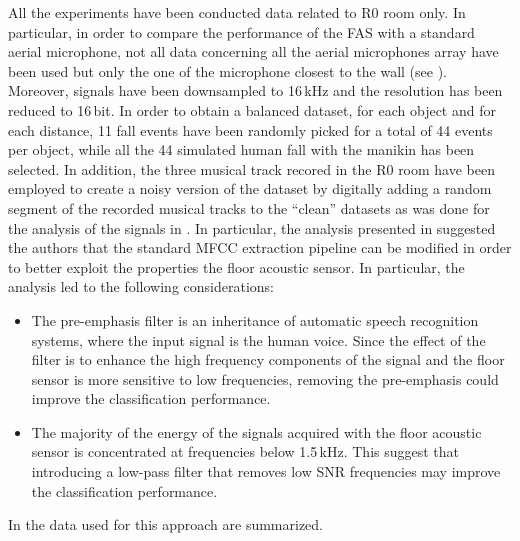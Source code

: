 All the experiments have been conducted data related to R0 room only. In particular, in order to compare the performance of the FAS with a standard aerial microphone, not all data concerning all the aerial microphones array have been used but only the one of the microphone closest to the wall (see ). Moreover, signals have been downsampled to 16\,kHz and the resolution has been reduced to 16\,bit. In order to obtain a balanced dataset, for each object and
for each distance, 11 fall events have been randomly picked for a total of 44 events per
object, while all the 44 simulated human fall with the manikin has been selected. In addition, the three musical track recored in the R0 room have been employed to create a noisy version of
the dataset by digitally adding a random segment of the recorded musical tracks
to the ``clean'' datasets as was done for the analysis of the signals in . In particular, the analysis presented in  suggested the authors that the standard MFCC extraction pipeline can be modified in order to better exploit the properties the floor acoustic sensor. In particular, the analysis led to the following considerations:
\begin{itemize}
	\item The pre-emphasis filter is an inheritance of automatic speech recognition systems, where the input signal is the human voice. Since the effect of the filter is to enhance the high frequency components of the signal and the floor sensor is more sensitive to low frequencies, removing the pre-emphasis could improve the classification performance.
	\item The majority of the energy of the signals acquired with the floor acoustic sensor is concentrated at frequencies below 1.5\,kHz. This suggest that introducing a low-pass filter that removes low SNR frequencies may improve the classification performance.
\end{itemize}
In  the data used for this approach are summarized.
